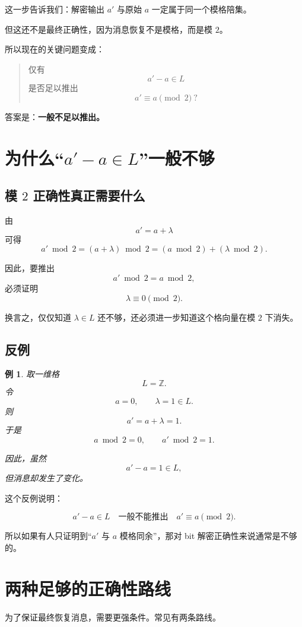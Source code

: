 \documentclass[12pt,a4paper]{article}
\newtheorem{example}{例}
\begin{document}
这一步告诉我们：解密输出 \(a'\) 与原始 \(a\) 一定属于同一个模格陪集。

但这还不是最终正确性，因为消息恢复不是模格，而是模 \(2\)。

所以现在的关键问题变成：

\begin{quote}
仅有
\[
a'-a\in L
\]
是否足以推出
\[
a' \equiv a \pmod 2 \ ?
\]
\end{quote}

答案是：\textbf{一般不足以推出。}

\section{为什么“\(a'-a\in L\)”一般不够}

\subsection{模 \(2\) 正确性真正需要什么}

由
\[
a' = a+\lambda
\]
可得
\[
a' \bmod 2 = (a+\lambda)\bmod 2 = (a\bmod 2)+(\lambda\bmod 2).
\]

因此，要推出
\[
a' \bmod 2 = a \bmod 2,
\]
必须证明
\[
\lambda \equiv 0 \pmod 2.
\]

换言之，仅仅知道 \(\lambda\in L\) 还不够，还必须进一步知道这个格向量在模 \(2\) 下消失。

\subsection{反例}

\begin{example}
取一维格
\[
L=\mathbb Z.
\]
令
\[
a=0,\qquad \lambda=1\in L.
\]
则
\[
a' = a+\lambda = 1.
\]
于是
\[
a\bmod 2 = 0,\qquad a'\bmod 2 = 1.
\]

因此，虽然
\[
a'-a = 1 \in L,
\]
但消息却发生了变化。
\end{example}

这个反例说明：

\[
\boxed{
a'-a\in L \quad \text{一般不能推出} \quad a'\equiv a\pmod 2.
}
\]

所以如果有人只证明到“\(a'\) 与 \(a\) 模格同余”，那对 bit 解密正确性来说通常是不够的。

\section{两种足够的正确性路线}

为了保证最终恢复消息，需要更强条件。常见有两条路线。
\end{document}
